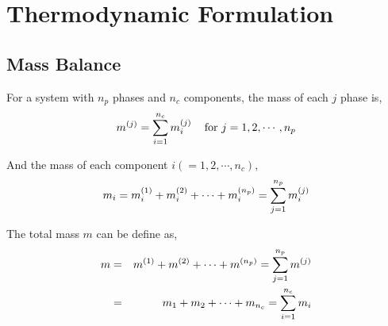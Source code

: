 
\chapter{Thermodynamic Formulation}\label{Chapter:ThermodynamicFormulation}
 
\section{Mass Balance}\label{Chapter:ThermodynamicFormulation:Section:MassBalance}
For a system with $n_{p}$ phases and $n_{c}$ components, the mass of each $j$ phase is,
\begin{equation}
m^{(j)} = \summation_{i=1}^{n_{c}}\mfr[m]{i}{j}\;\;\;\text{ for }j=1,2,\cdots,n_{p}
\label{Eqn_MassBalance_Phase}
\end{equation}

And the mass of each component $i\left(=1,2,\cdots,n_{c}\right)$,
\begin{equation}
m_{i} = m_{i}^{(1)} + m_{i}^{(2)} + \cdots + m_{i}^{\left(n_{p}\right)} = \summation_{j=1}^{n_{p}}\mfr[m]{i}{j}
\label{Eqn_MassBalance_Component}
\end{equation}

The total mass $m$ can be define as,
\begin{eqnarray}
m & = & m^{(1)} + m^{(2)} + \cdots + m^{\left(n_{p}\right)} = \summation_{j=1}^{n_{p}}m^{(j)} \nonumber \\
  & = & m_{1} + m_{2} + \cdots + m_{n_{c}} = \summation_{i=1}^{n_{c}}m_{i} \nonumber 
\label{Eqn_MassBalance_Mass}
\end{eqnarray}

